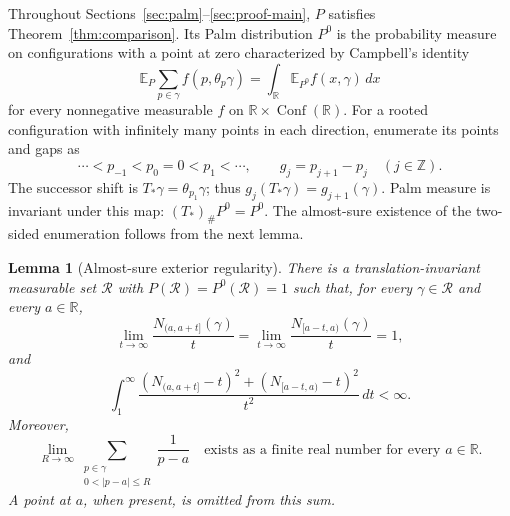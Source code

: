 \documentclass[11pt,reqno]{amsart}
\numberwithin{equation}{section}
\newtheorem{lemma}[theorem]{Lemma}
\theoremstyle{definition}
\theoremstyle{remark}
\newcommand{\R}{\mathbb R}
\newcommand{\Z}{\mathbb Z}
\newcommand{\E}{\mathbb E}
\newcommand{\1}{\mathbf 1}
\newcommand{\Conf}{\operatorname{Conf}}
\newcommand{\dd}{\,d}
\begin{document}
Throughout Sections~\ref{sec:palm}--\ref{sec:proof-main}, $P$ satisfies
Theorem~\ref{thm:comparison}. Its Palm distribution $P^0$ is the
probability measure on configurations with a point at zero characterized
by Campbell's identity
\begin{equation}\label{eq:campbell}
\E_P\sum_{p\in\gamma} f(p,\theta_p\gamma)
 =\int_\R\E_{P^0}f(x,\gamma)\dd x
\end{equation}
for every nonnegative measurable $f$ on $\R\times\Conf(\R)$.
For a rooted configuration with infinitely many points in each
direction, enumerate its points and gaps as
\begin{equation}\label{eq:palm-points-gaps}
\cdots<p_{-1}<p_0=0<p_1<\cdots,\qquad
 g_j=p_{j+1}-p_j\quad(j\in\Z).
\end{equation}
The successor shift is $T_*\gamma=\theta_{p_1}\gamma$; thus
$g_j(T_*\gamma)=g_{j+1}(\gamma)$. Palm measure is invariant under this
map: $(T_*)_\#P^0=P^0$. The almost-sure existence of the two-sided
enumeration follows from the next lemma.

\begin{samepage}
\begin{lemma}[Almost-sure exterior regularity]\label{lem:as-regularity}
There is a translation-invariant measurable set $\mathcal R$ with
$P(\mathcal R)=P^0(\mathcal R)=1$ such that, for every
$\gamma\in\mathcal R$ and every $a\in\R$,
\begin{equation}\label{eq:as-density}
\lim_{t\to\infty}\frac{N_{(a,a+t]}(\gamma)}t
 =\lim_{t\to\infty}\frac{N_{[a-t,a)}(\gamma)}t=1,
\end{equation}
and
\begin{equation}\label{eq:as-integral}
\int_1^\infty\frac{
  (N_{(a,a+t]}-t)^2+(N_{[a-t,a)}-t)^2}{t^2}\dd t<\infty.
\end{equation}
Moreover,
\begin{equation}\label{eq:reciprocal-pv}
\lim_{R\to\infty}
\sum_{\substack{p\in\gamma\\0<|p-a|\le R}}\frac1{p-a}
\quad\text{exists as a finite real number for every }a\in\R.
\end{equation}
A point at $a$, when present, is omitted from this sum.
\end{lemma}
\end{samepage}
\end{document}
